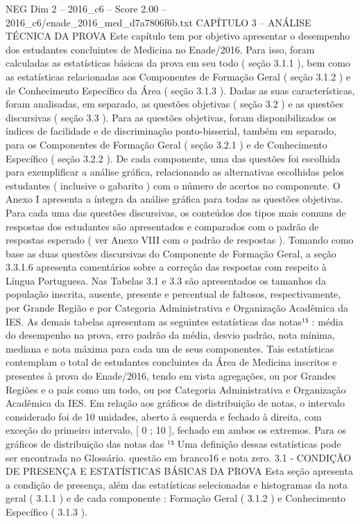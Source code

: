 \begin{textsample}{NEG Dim 2 – 2016\_c6 – Score 2.00 – 2016\_c6/enade\_2016\_med\_d7a7806f6b.txt}  \label{ex:f2_neg_230}
CAPÍTULO 3 – ANÁLISE TÉCNICA DA PROVA Este capítulo tem por objetivo apresentar o desempenho dos estudantes concluintes de Medicina no Enade/2016.
Para isso, foram calculadas as estatísticas básicas da prova em seu todo ( seção 3.1.1 ), bem como as estatísticas relacionadas aos Componentes de Formação Geral ( seção 3.1.2 ) e de Conhecimento Específico da Área ( seção 3.1.3 ).
Dadas as suas características, foram analisadas, em separado, as questões objetivas ( seção 3.2 ) e as questões discursivas ( seção 3.3 ).
Para as questões objetivas, foram disponibilizados os índices de facilidade e de discriminação ponto-bisserial, também em separado, para os Componentes de Formação Geral ( seção 3.2.1 ) e de Conhecimento Específico ( seção 3.2.2 ).
De cada componente, uma das questões foi escolhida para exemplificar a análise gráfica, relacionando as alternativas escolhidas pelos estudantes ( inclusive o gabarito ) com o número de acertos no componente.
O Anexo I apresenta a íntegra da análise gráfica para todas as questões objetivas.
Para cada uma das questões discursivas, os conteúdos dos tipos mais comuns de respostas dos estudantes são apresentados e comparados com o padrão de respostas esperado ( ver Anexo VIII com o padrão de respostas ).
Tomando como base as duas questões discursivas do Componente de Formação Geral, a seção 3.3.1.6 apresenta comentários sobre a correção das respostas com respeito à Língua Portuguesa.
Nas Tabelas 3.1 e 3.3 são apresentados os tamanhos da população inscrita, ausente, presente e percentual de faltosos, respectivamente, por Grande Região e por Categoria Administrativa e Organização Acadêmica da IES.
As demais tabelas apresentam as seguintes estatísticas das notas¹⁵ : média do desempenho na prova, erro padrão da média, desvio padrão, nota mínima, mediana e nota máxima para cada um de seus componentes.
Tais estatísticas contemplam o total de estudantes concluintes da Área de Medicina inscritos e presentes à prova do Enade/2016, tendo em vista agregações, ou por Grandes Regiões e o país como um todo, ou por Categoria Administrativa e Organização Acadêmica da IES.
Em relação aos gráficos de distribuição de notas, o intervalo considerado foi de 10 unidades, aberto à esquerda e fechado à direita, com exceção do primeiro intervalo, [ 0 ; 10 ], fechado em ambos os extremos.
Para os gráficos de distribuição das notas das ¹⁵ Uma definição dessas estatísticas pode ser encontrada no Glossário. questão em branco16 e nota zero. 3.1 - CONDIÇÃO DE PRESENÇA E ESTATÍSTICAS BÁSICAS DA PROVA Esta seção apresenta a condição de presença, além das estatísticas selecionadas e histogramas da nota geral ( 3.1.1 ) e de cada componente : Formação Geral ( 3.1.2 ) e Conhecimento Específico ( 3.1.3 ).

\end{textsample}
